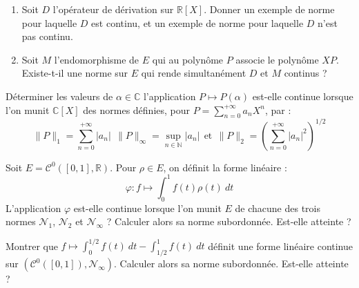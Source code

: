 \documentclass[french,a4paper]{article}
\newcommand{\N}{\mathbb{N}}
\newcommand{\R}{\mathbb{R}}
\newcommand{\C}{\mathbb{C}}
\theoremstyle{plain}
\theoremstyle{definition}
\theoremstyle{remark}
\begin{document}
\begin{ex}[Moulin.26]{}
	\begin{enumerate}
		\item Soit $D$ l'opérateur de dérivation sur $\R[X]$. Donner un exemple de norme pour laquelle $D$ est continu, et un exemple de norme pour laquelle $D$ n'est pas continu.
		\item Soit $M$ l'endomorphisme de $E$ qui au polynôme $P$ associe le polynôme $XP$. Existe-t-il une norme sur $E$ qui rende simultanément $D$ et $M$ continus ?
	\end{enumerate}
\end{ex}

\begin{ex}[Moulin.27]{}
	Déterminer les valeurs de $\alpha\in\C$ l'application $P\mapsto P(\alpha)$ est-elle continue lorsque l'on munit $\C[X]$ des normes définies, pour $P=\displaystyle\sum_{n=0}^{+\infty}a_nX^n$, par : $$\lVert P\rVert_1=\sum_{n=0}^{+\infty}\lvert a_n\rvert \ \ \lVert P\rVert_\infty=\underset{n\in\N}{\sup}\lvert a_n\rvert\ \ \text{et}\ \ \lVert P\rVert_2=\left(\sum_{n=0}^{+\infty}\lvert a_n\rvert^2\right)^{1/2}$$
\end{ex}

\begin{ex}[Moulin.28]{}
	Soit $E=\mathcal{C}^0([0,1],\R)$. Pour $\rho\in E$, on définit la forme linéaire : $$\varphi: f\mapsto\int_{0}^{1}f(t)\rho(t)\ dt$$ L'application $\varphi$ est-elle continue lorsque l'on munit $E$ de chacune des trois normes $\mathcal{N}_1$, $\mathcal{N}_2$ et $\mathcal{N}_\infty$ ? Calculer alors sa norme subordonnée. Est-elle atteinte ? 
\end{ex}

\begin{ex}[Moulin.29]{}
	Montrer que $f\mapsto\displaystyle\int_{0}^{1/2}f(t)\ dt-\int_{1/2}^{1}f(t)\ dt$ définit une forme linéaire continue sur $\left(\mathcal{C}^0([0,1]),\mathcal{N}_\infty\right)$. Calculer alors sa norme subordonnée. Est-elle atteinte ?
\end{ex}
\end{document}
